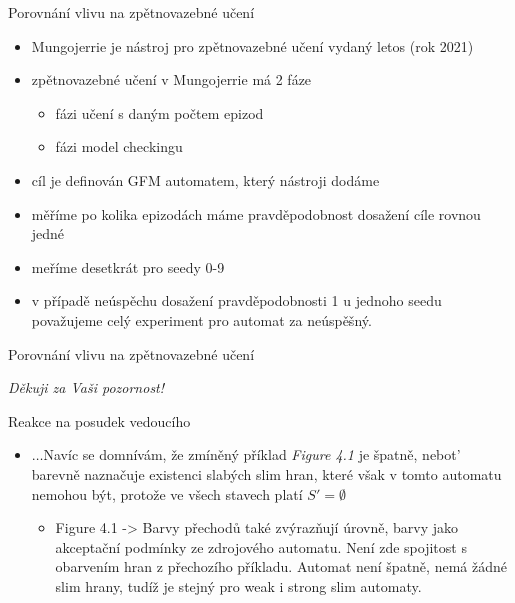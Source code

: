 \documentclass[
]{beamer}
\begin{document}
	
\begin{frame}{Porovnání vlivu na zpětnovazebné učení}
	\begin{itemize}
		\pause
		\item \alert{Mungojerrie} je nástroj pro zpětnovazebné učení vydaný letos (rok 2021)\pause
		\item zpětnovazebné učení v Mungojerrie má 2 fáze\pause
		\begin{itemize}
			\item fázi učení s daným počtem epizod
			\item fázi model checkingu
		\end{itemize}\pause
		\item \alert{cíl je definován GFM automatem}, který nástroji dodáme\pause
		\item měříme po kolika epizodách máme pravděpodobnost dosažení cíle rovnou jedné\pause
		\item meříme desetkrát pro seedy 0-9\pause
		\item v případě neúspěchu dosažení pravděpodobnosti 1 u jednoho seedu považujeme celý experiment pro automat za neúspěšný.
	\end{itemize}
		
\end{frame}
\begin{frame}{Porovnání vlivu na zpětnovazebné učení}
	
	\pause
	\begin{flushright}\emph{Děkuji za Vaši pozornost!}\end{flushright}

\end{frame}



\appendix




	\begin{frame}{Reakce na posudek vedoucího}
		\begin{itemize}
		\item $\ldots$Navíc se domnívám, že zmíněný příklad \emph{Figure 4.1} je špatně, nebot’ barevně naznačuje existenci slabých slim hran, které však v tomto automatu nemohou být, protože ve všech stavech platí $S'= \emptyset$
		\begin{itemize}
		\item Figure 4.1 -> Barvy přechodů také zvýrazňují úrovně, barvy jako akceptační podmínky ze zdrojového automatu. Není zde spojitost s obarvením hran z přechozího příkladu. Automat není špatně, nemá žádné slim hrany, tudíž je stejný pro weak i strong slim automaty.
		\end{itemize}
	\end{itemize}

		
		
	\end{frame}
	
\end{document}
